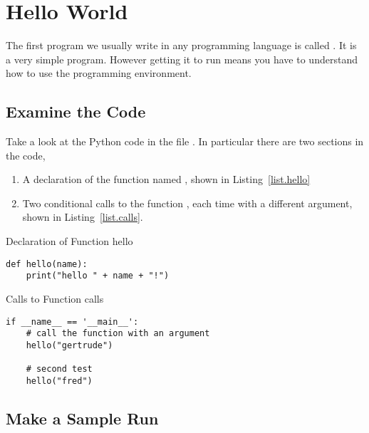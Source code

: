 \section{Hello World}
\label{sec.hello.world}

The first program we usually write in any programming language is
called .  It is a very simple program.  However
getting it to run means you have to understand how to use the
programming environment.

\subsection{Examine the Code}
\label{sec.examine.the.code}
Take a look at the Python code in the file .  In
particular there are two sections in the code,
\begin{enumerate}
\item A declaration of the function named , shown in
  Listing~\ref{list.hello}
\item Two conditional calls to the function , each time
  with a different argument, shown in Listing~\ref{list.calls}.
\end{enumerate}

\begin{listing}{Declaration of Function }{hello}
\begin{minipage}[c]{0.95\textwidth}\begin{lstlisting}
def hello(name):
    print("hello " + name + "!")
\end{lstlisting}\end{minipage}\end{listing}

\begin{listing}{Calls to Function }{calls}
\begin{minipage}[c]{0.95\textwidth}\begin{lstlisting}
if __name__ == '__main__':
    # call the function with an argument
    hello("gertrude")
    
    # second test
    hello("fred")
\end{lstlisting}\end{minipage}\end{listing}


\subsection{Make a Sample Run}

